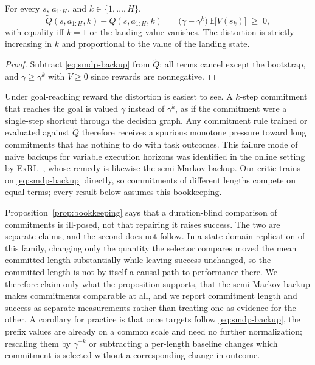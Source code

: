 \begin{proposition}
\label{prop:bookkeeping}
For every $s$, $a_{1:H}$, and $k\in\{1,\dots,H\}$,
\[
\widetilde Q(s,a_{1:H},k)-Q(s,a_{1:H},k)
  \;=\;\bigl(\gamma-\gamma^{k}\bigr)\,\mathbb E\bigl[V(s_k)\bigr]\;\ge\;0 ,
\]
with equality iff $k=1$ or the landing value vanishes. The distortion is strictly increasing in
$k$ and proportional to the value of the landing state.
\end{proposition}
\begin{proof}
Subtract \eqref{eq:smdp-backup} from $\widetilde Q$; all terms cancel except the bootstrap, and
$\gamma\ge\gamma^{k}$ with $V\ge0$ since rewards are nonnegative.
\end{proof}

Under goal-reaching reward the distortion is easiest to see. A $k$-step commitment that reaches
the goal is valued $\gamma$ instead of $\gamma^{k}$, as if the commitment were a single-step
shortcut through the decision graph. Any commitment rule trained or evaluated against
$\widetilde Q$ therefore receives a spurious monotone pressure toward long commitments that has
nothing to do with task outcomes. This failure mode of naive backups for variable execution
horizons was identified in the online setting by ExRL~\citep{exrl}, whose remedy is likewise the
semi-Markov backup. Our critic trains on \eqref{eq:smdp-backup} directly, so commitments of
different lengths compete on equal terms; every result below assumes this bookkeeping.

\begin{remark}
\label{rem:scope}
Proposition~\ref{prop:bookkeeping} says that a duration-blind comparison of commitments is
ill-posed, not that repairing it raises success. The two are separate claims, and the second does
not follow. In a state-domain replication of this family, changing only the quantity the selector
compares moved the mean committed length substantially while leaving success unchanged, so the
committed length is not by itself a causal path to performance there. We therefore claim only what
the proposition supports, that the semi-Markov backup makes commitments comparable at all, and we
report commitment length and success as separate measurements rather than treating one as evidence
for the other. A corollary for practice is that once targets follow \eqref{eq:smdp-backup}, the
prefix values are already on a common scale and need no further normalization; rescaling them by
$\gamma^{-k}$ or subtracting a per-length baseline changes which commitment is selected without a
corresponding change in outcome.
\end{remark}


